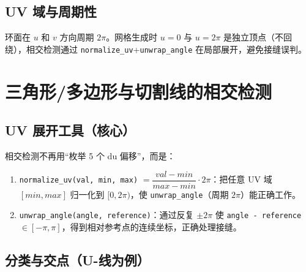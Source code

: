 \documentclass[12pt,a4paper]{article}
\begin{document}
\subsection{UV 域与周期性}

环面在 $u$ 和 $v$ 方向周期 $2\pi$。网格生成时 $u=0$ 与 $u=2\pi$ 是独立顶点（不回绕），相交检测通过 \texttt{normalize\_uv}+\texttt{unwrap\_angle} 在局部展开，避免接缝误判。

\section{三角形/多边形与切割线的相交检测}

\subsection{UV 展开工具（核心）}

相交检测不再用“枚举 5 个 du 偏移”，而是：
\begin{enumerate}
\item \texttt{normalize\_uv(val, min, max)} $=\dfrac{val-min}{max-min}\cdot 2\pi$：把任意 UV 域 $[min,max]$ 归一化到 $[0,2\pi)$，使 \texttt{unwrap\_angle}（周期 $2\pi$）能正确工作。
\item \texttt{unwrap\_angle(angle, reference)}：通过反复 $\pm 2\pi$ 使
  \texttt{angle - reference} $\in [-\pi, \pi]$，得到相对参考点的连续坐标，正确处理接缝。
\end{enumerate}

\subsection{分类与交点（U-线为例）}
\end{document}
